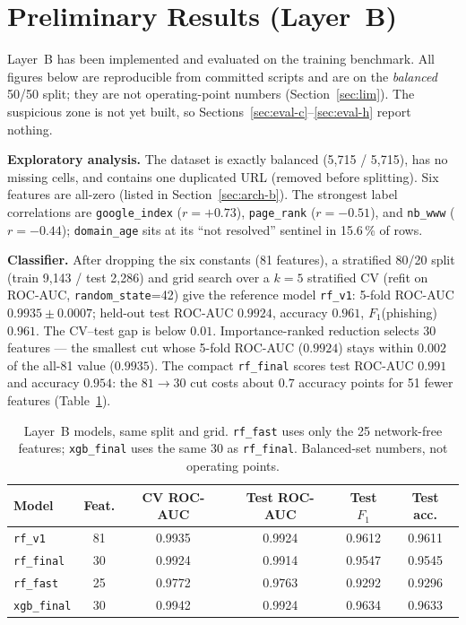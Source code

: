 \documentclass[conference]{IEEEtran}
\begin{document}
\section{Preliminary Results (Layer~B)}
\label{sec:results}
Layer~B has been implemented and evaluated on the training benchmark. All figures
below are reproducible from committed scripts and are on the \emph{balanced}
50/50 split; they are not operating-point numbers (Section~\ref{sec:lim}). The
suspicious zone is not yet built, so Sections~\ref{sec:eval-c}--\ref{sec:eval-h}
report nothing.

\textbf{Exploratory analysis.} The dataset is exactly balanced
(5{,}715 / 5{,}715), has no missing cells, and contains one duplicated URL
(removed before splitting). Six features are all-zero (listed in
Section~\ref{sec:arch-b}). The strongest label correlations are
\texttt{google\_index} ($r=+0.73$), \texttt{page\_rank} ($r=-0.51$), and
\texttt{nb\_www} ($r=-0.44$); \texttt{domain\_age} sits at its ``not resolved''
sentinel in 15.6\,\% of rows.

\textbf{Classifier.} After dropping the six constants (81 features), a stratified
80/20 split (train 9{,}143 / test 2{,}286) and grid search over a $k=5$
stratified CV (refit on ROC-AUC, \texttt{random\_state}=42) give the reference
model \texttt{rf\_v1}: 5-fold ROC-AUC $0.9935\pm0.0007$; held-out test ROC-AUC
$0.9924$, accuracy $0.961$, $F_1$(phishing) $0.961$. The CV--test gap is below
$0.01$. Importance-ranked reduction selects 30 features --- the smallest cut whose
5-fold ROC-AUC ($0.9924$) stays within $0.002$ of the all-81 value ($0.9935$).
The compact \texttt{rf\_final} scores test ROC-AUC $0.991$ and accuracy $0.954$:
the $81\!\to\!30$ cut costs about $0.7$ accuracy points for 51 fewer features
(Table~\ref{tab:models}).

\begin{table}[t]
\centering
\caption{Layer~B models, same split and grid. \texttt{rf\_fast} uses only the 25
network-free features; \texttt{xgb\_final} uses the same 30 as \texttt{rf\_final}.
Balanced-set numbers, not operating points.}
\label{tab:models}
\footnotesize
\begin{tabular}{@{}lccccc@{}}
\toprule
Model & Feat. & CV ROC-AUC & Test ROC-AUC & Test $F_1$ & Test acc. \\
\midrule
\texttt{rf\_v1}    & 81 & 0.9935 & 0.9924 & 0.9612 & 0.9611 \\
\texttt{rf\_final} & 30 & 0.9924 & 0.9914 & 0.9547 & 0.9545 \\
\texttt{rf\_fast}  & 25 & 0.9772 & 0.9763 & 0.9292 & 0.9296 \\
\texttt{xgb\_final}& 30 & 0.9942 & 0.9924 & 0.9634 & 0.9633 \\
\bottomrule
\end{tabular}
\end{table}
\end{document}
